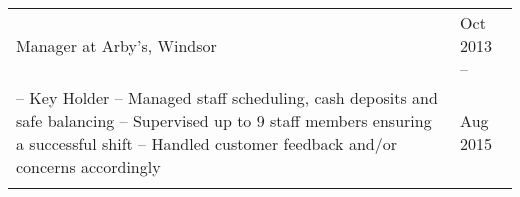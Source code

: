 \documentclass[a4paper,10.5pt]{article}
\begin{document}
\begin{tabular}{p{13cm}|l}
Manager at  {Arby's}, Windsor & \small {Oct 2013 --} \\
\footnotesize{
-- Key Holder \newline
-- Managed staff scheduling, cash deposits and safe balancing \newline
-- Supervised up to 9 staff members ensuring a successful shift \newline
-- Handled customer feedback and/or concerns accordingly
} &\small {Aug 2015}  \\\multicolumn{2}{c}{} \\


\end{tabular}
\end{document}
